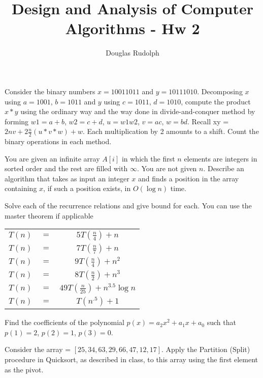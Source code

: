 \documentclass[12pt]{article}
\newenvironment{problem}[2][Problem]{\begin{trivlist}
\item[\hskip \labelsep {\bfseries #1}\hskip \labelsep {\bfseries #2.}]}{\end{trivlist}}
\begin{document}
 
\title{Design and Analysis of Computer Algorithms - Hw 2}
\author{Douglas Rudolph}
\maketitle
 
\begin{problem}{1}
Consider the binary numbers $x = 10011011$ and $y = 10111010$. Decomposing $x$ using $a = 1001$, $b = 1011$
and $y$ using $c = 1011$, $d = 1010$, compute the product $x*y$ using the ordinary way and the way done in
divide-and-conquer method by forming $w1 = a + b$, $w2 = c + d$, $u = w1w2$, $v = ac$, $w = bd$. Recall xy =
$2nv + 2\frac{n}{2} (u*v*w) + w$. Each multiplication by 2 amounts to a shift. Count the binary operations in
each method.
\end{problem}
 

\begin{problem}{2}
You are given an infinite array $A[i]$ in which the first $n$ elements are integers in sorted order and the rest
are filled with $∞$. You are not given $n$. Describe an algorithm that takes as input an integer $x$ and finds a
position in the array containing $x$, if such a position exists, in $O(\log n)$ time.
\end{problem}

\begin{problem}{3}
Solve each of the recurrence relations and give bound for each. You can use the master theorem if applicable
	\begin{center}
		\begin{tabular}{c c c}
			$T(n)$ &$=$ &$5T(\frac{n}{4}) + n$ \\
		 	$T(n)$ &$=$ &$7T(\frac{n}{7}) + n$ \\
		 	$T(n)$ &$=$ &$9T(\frac{n}{4}) + n^{2}$ \\
		 	$T(n)$ &$=$ &$8T(\frac{n}{2}) + n^{3}$ \\
		 	$T(n)$ &$=$ &$49T(\frac{n}{25}) + n^{3.5}\log n$ \\	
		 	$T(n)$ &$=$ &$T(n^{.5}) + 1$ \\
		\end{tabular}
	\end{center}
\end{problem}

\begin{problem}{4}
Find the coefficients of the polynomial $p(x) = a_{2}x^{2}+a_{1}x+a_{0}$ such that $p(1) = 2$, $p(2) = 1$, $p(3) = 0$.
\end{problem}

\begin{problem}{5}
Consider the array = $[25, 34, 63, 29, 66, 47, 12, 17]$. Apply the Partition (Split) procedure in Quicksort, as described in class, to this array using the first element as the pivot.
\end{problem}
\end{document}
